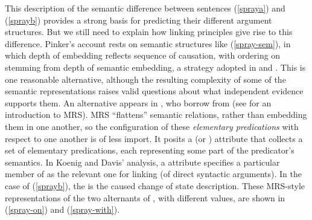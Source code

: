 \documentclass[output=paper
 	        ,biblatex
                ,babelshorthands
                ,newtxmath
                ,draftmode
                ,colorlinks, citecolor=brown
]{langscibook}
\begin{document}
This description of the semantic difference between sentences (\ref{spraya}) and (\ref{sprayb}) provides a strong basis for predicting their different argument structures.
But we still need to explain how linking principles give rise to this difference.
Pinker's account rests on semantic structures like (\ref{spray-sem}), in which depth of embedding reflects sequence of causation, with ordering on \argst stemming from depth of semantic embedding, a strategy adopted in \citet{Davis1996} and \citet{Davis2001}.
This is one reasonable alternative, although the resulting complexity of some of the semantic representations raises valid questions about what independent evidence supports them.
An alternative appears in \citet{KoenigandDavis2006}, who borrow from  (see  for an introduction to MRS).
MRS ``flattens'' semantic relations, rather than embedding them in one another, so the configuration of these \emph{elementary predications} with respect to one another is of less import.
It posits a  (or \rels) attribute that collects a set of elementary predications, each representing some part of the predicator's semantics.
In Koenig and Davis' analysis, a  attribute specifies a particular member of \rels as the relevant one for linking (of direct syntactic arguments).
In the case of (\ref{sprayb}), the  is the caused change of state description.
These MRS-style representations of the two alternants of , with different  values, are shown in (\ref{spray-on}) and (\ref{spray-with}).

\begin{exe}
\ex\label{spray-on}
\end{exe}

\begin{exe}\ex\label{spray-with}
\end{exe}                  
                  
\end{document}
